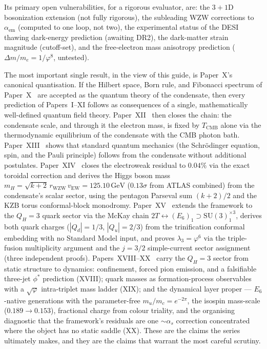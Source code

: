 \documentclass[11pt,a4paper]{article}
\newcommand{\vp}{\varphi}
\newcommand{\aem}{\alpha_{\mathrm{em}}}
\newcommand{\TCMB}{T_{\mathrm{CMB}}}
\newcommand{\vEW}{v_{\mathrm{EW}}}
\newcommand{\mH}{m_H}
\begin{document}
Its primary open vulnerabilities, for a rigorous evaluator, are: the $3+1$D
bosonization extension (not fully rigorous), the subleading WZW corrections
to $\aem$ (computed to one loop, not two), the experimental status of the
DESI thawing dark-energy prediction (awaiting DR2), the dark-matter strain
magnitude (cutoff-set), and the free-electron mass anisotropy prediction
($\Delta m/m_e = 1/\vp^8$, untested).

The most important single result, in the view of this guide, is Paper~X's
canonical quantisation. If the Hilbert space, Born rule, and Fibonacci spectrum
of Paper~X~\cite{Paper10} are accepted as the quantum theory of the condensate, then every
prediction of Papers~I--XI follows as consequences of a single, mathematically
well-defined quantum field theory. Paper~XII~\cite{Paper12} then closes the chain: the condensate
scale, and through it the electron mass, is fixed by $\TCMB$ alone via the
thermodynamic equilibrium of the condensate with the CMB photon bath.
Paper~XIII~\cite{Paper13} shows that standard quantum mechanics (the Schr\"odinger equation,
spin, and the Pauli principle) follows from the condensate without additional
postulates. Paper~XIV~\cite{Paper14} closes the electroweak residual to $0.04\%$ via the
exact toroidal correction and derives the Higgs boson mass
$\mH = \sqrt{k+2}\,r_{\mathrm{WZW}}\,\vEW = 125.10\,\mathrm{GeV}$
($0.13\sigma$ from ATLAS combined) from the condensate's scalar sector, using the
pentagon Parseval sum $(k+2)/2$ and the KZB torus conformal-block monodromy.
Paper~XV~\cite{Paper15} extends the framework to the $Q_H=3$ quark sector via
the McKay chain $2T\leftrightarrow(E_6)_1\supset\mathrm{SU}(3)_1^{\times 3}$,
derives both quark charges ($|Q_d|=1/3$, $|Q_u|=2/3$) from the trinification
conformal embedding with no Standard Model input, and proves $\lambda_3=\vp^6$
via the triple-fusion multiplicity argument and the $j=3/2$ simple-current
sector assignment (three independent proofs).
Papers~XVIII--XX~\cite{Paper18,Paper19,Paper20} carry the $Q_H=3$ sector from
static structure to dynamics: confinement, forced pion emission, and a
falsifiable three-jet $\phi^*$ prediction (XVIII); quark masses as
formation-process observables with a $\sqrt\vp$ intra-triplet mass ladder
(XIX); and the dynamical layer proper --- $E_6$-native generations with the
parameter-free $m_u/m_c=e^{-2\pi}$, the isospin mass-scale ($0.189\to0.153$),
fractional charge from colour triality, and the organising diagnostic that the
framework's residuals are one $\sim\alpha_s$ correction concentrated where the
object has no static saddle (XX).
These are the claims the series ultimately makes, and they are the claims that
warrant the most careful scrutiny.
\end{document}
